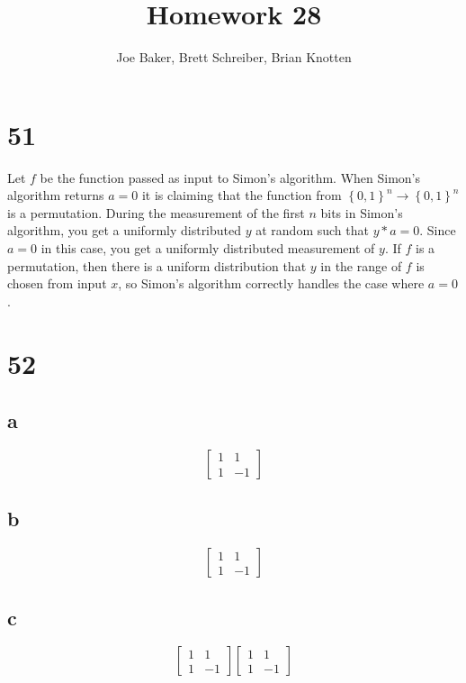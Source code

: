 \documentclass[letterpaper,notitlepage,twoside]{article}
\begin{document}
\title{Homework 28}
\author{Joe Baker, Brett Schreiber, Brian Knotten}
\maketitle

\section*{51}
Let $f$ be the function passed as input to Simon's algorithm. When Simon's algorithm returns $a=0$ it is claiming that the function from $\left\{0,1\right\}^n \rightarrow \left\{0,1\right\}^n$ is a permutation. During the measurement of the first $n$ bits in Simon's algorithm, you get a uniformly distributed $y$ at random such that $y*a=0$. Since $a=0$ in this case, you get a uniformly distributed measurement of $y$. If $f$ is a permutation, then there is a uniform distribution that $y$ in the range of $f$ is chosen from input $x$, so Simon's algorithm correctly handles the case where $a=0$.

\section*{52}
\subsection*{a}
\[
\begin{bmatrix}
1 &  1 \\
1 & -1
\end{bmatrix}
\]
\subsection*{b}
\[
\begin{bmatrix}
1 &  1 \\
1 & -1
\end{bmatrix}
\]
\subsection*{c}
\[
\begin{bmatrix}
1 &  1 \\
1 & -1
\end{bmatrix}
\begin{bmatrix}
1 &  1 \\
1 & -1
\end{bmatrix}
\]
\end{document}

